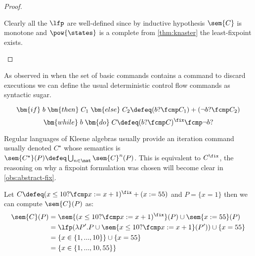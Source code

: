 \begin{definition}
\begin{proof}
\begin{itemize}
        Clearly all the $\lfp$ are well-defined since by inductive hypothesis
        $\sem{C}$ is monotone and $\pow{\states}$ is a complete from 
        \ref{thm:knaster} the least-fixpoint exists.
    \end{itemize}

  \end{proof}

  \begin{observation}
    As observed in \cite{Fischer79} when the set of basic commands contains a 
    command to discard executions we can define the usual deterministic control 
    flow commands as syntactic sugar.

    $$\bm{if} \; b \; \bm{then} \; C_1 \; \bm{else} \; C_2 \defeq (b ? \fcmp C_1) 
    + (\neg b ? \fcmp C_2)$$
    $$\bm{while} \; b \; \bm{do} \; C \defeq (b? \fcmp C)^\fix \fcmp \neg b ?$$
  \end{observation}

  \begin{observation}
    Regular languages of Kleene algebras \cite{Kozen97} usually provide an
    iteration command usually denoted $C^\star$ whose semantics is
    $\sem{C^\star}(P) \defeq \bigcup_{n \in \nat} \sem{C}^n(P)$. This is
    equivalent to $C^\fix$, the reasoning on why a fixpoint formulation was
    chosen will become clear in \ref{obs:abstract-fix}.
  \end{observation}

  \begin{example}
    Let $C \defeq (x \leq 10? \fcmp x := x + 1)^\fix + (x := 55)$ and 
    $P = \{ x = 1 \}$ then we can compute $\sem{C}(P)$ as:
    \begin{align*}
      \sem{C}(P)
        &= \sem{(x \leq 10? \fcmp x := x +1)^\fix}(P) \cup \sem{x := 55}(P) \\
        &= \lfp(\lambda P' . P \cup \sem{x \leq 10? \fcmp x := x + 1}(P'))
          \cup \{x = 55\} \\
        &= \{ x \in \{1, ..., 10\} \} \cup \{x = 55\} \\
        &= \{ x \in \{1, ..., 10, 55\} \}
    \end{align*}
  \end{example}

\end{definition}
